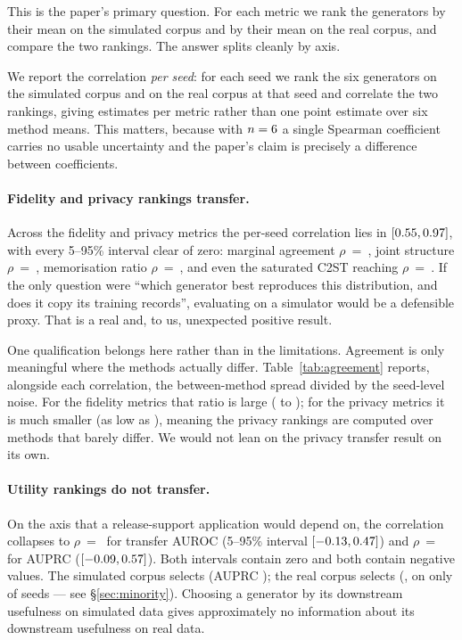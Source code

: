 \documentclass[11pt]{article}
\begin{document}
This is the paper's primary question. For each metric we rank the \nMethods{}
generators by their mean on the simulated corpus and by their mean on the real
corpus, and compare the two rankings. The answer splits cleanly by axis.

We report the correlation \emph{per seed}: for each seed we rank the six
generators on the simulated corpus and on the real corpus at that seed and
correlate the two rankings, giving \nSeeds{} estimates per metric rather than one
point estimate over six method means. This matters, because with $n=6{}$
a single Spearman coefficient carries no usable uncertainty and the paper's claim
is precisely a difference between coefficients.

\paragraph{Fidelity and privacy rankings transfer.} Across the \agreeFidPrivN{}
fidelity and privacy metrics the per-seed correlation lies in
$[0.55{}, 0.97{}]$, with every 5--95\% interval clear of zero:
marginal agreement $\rho$~=~\ciKsRho{}, joint structure $\rho$~=~\ciCorrRho{},
memorisation ratio $\rho$~=~\ciDcrRho{}, and even the saturated C2ST reaching
$\rho$~=~\ciCtstRho{}. If the only question were ``which generator best
reproduces this distribution, and does it copy its training records'', evaluating
on a simulator would be a defensible proxy. That is a real and, to us,
unexpected positive result.

One qualification belongs here rather than in the limitations. Agreement is only
meaningful where the methods actually differ. Table~\ref{tab:agreement} reports,
alongside each correlation, the between-method spread divided by the seed-level
noise. For the fidelity metrics that ratio is large (\sepKsReal{} to
\sepCorrSim{}); for the privacy metrics it is much smaller (as low as
\sepMiaSim{}), meaning the privacy rankings are computed over methods that barely
differ. We would not lean on the privacy transfer result on its own.

\paragraph{Utility rankings do not transfer.} On the axis that a
release-support application would depend on, the correlation collapses to
$\rho$~=~\ciAurocRho{} for transfer AUROC (5--95\% interval $[-0.13{},
0.47{}]$) and $\rho$~=~\ciAuprcRho{} for AUPRC ($[-0.09{},
0.57{}]$). Both intervals contain zero and both contain negative values.
The simulated corpus selects \bestUtilSim{} (AUPRC \bestUtilSimVal{}); the real
corpus selects \bestUtilReal{} (\bestUtilRealVal{}, on only
\vaeDegenRealSeeds{} of \nSeeds{} seeds --- see \S\ref{sec:minority}). Choosing a
generator by its downstream usefulness on simulated data gives approximately no
information about its downstream usefulness on real data.
\end{document}
